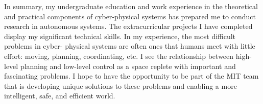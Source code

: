 \documentclass[]{letter}
\begin{document}
In summary, my undergraduate education and work experience in the theoretical and practical components of cyber‑physical systems has prepared me to conduct research in autonomous systems. The extracurricular projects I have completed display my significant technical skills. In my experience, the most difficult problems in cyber- physical systems are often ones that humans meet with little effort: moving, planning, coordinating, etc. I see the relationship between high-level planning and low-level control as a space replete with important and fascinating problems. I hope to have the opportunity to be part of the MIT team that is developing unique solutions to these problems and enabling a more intelligent, safe, and efficient world.
\end{document}
